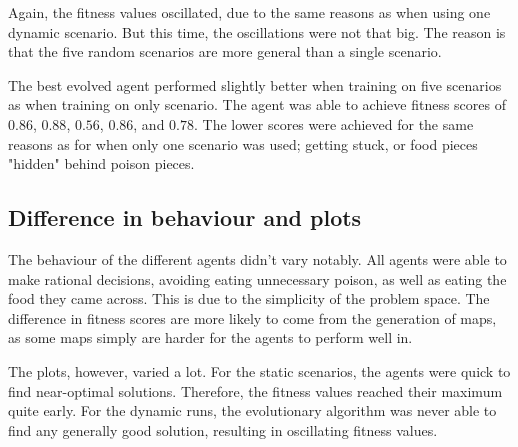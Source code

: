 \documentclass[
]{article}
\begin{document}
Again, the fitness values oscillated, due to the same reasons as when using one dynamic scenario. But this time, the oscillations were not that big. The reason is that the five random scenarios are more general than a single scenario.

The best evolved agent performed slightly better when training on five scenarios as when training on only scenario. The agent was able to achieve fitness scores of $0.86$, $0.88$, $0.56$, $0.86$, and $0.78$. The lower scores were achieved for the same reasons as for when only one scenario was used; getting stuck, or food pieces "hidden" behind poison pieces.

\subsection{Difference in behaviour and plots}
The behaviour of the different agents didn't vary notably. All agents were able to make rational decisions, avoiding eating unnecessary poison, as well as eating the food they came across. This is due to the simplicity of the problem space. The difference in fitness scores are more likely to come from the generation of maps, as some maps simply are harder for the agents to perform well in.

The plots, however, varied a lot. For the static scenarios, the agents were quick to find near-optimal solutions. Therefore, the fitness values reached their maximum quite early. For the dynamic runs, the evolutionary algorithm was never able to find any generally good solution, resulting in oscillating fitness values.

\end{document}

